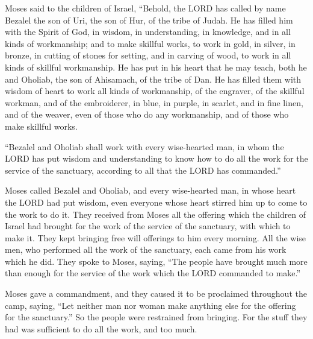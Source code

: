 \myverse{}Moses said to the children of Israel, “Behold, the LORD has
called by name Bezalel the son of Uri, the son of Hur, of the tribe of Judah.
\myverse{}He has filled him with the Spirit of God, in wisdom, in understanding, in
knowledge, and in all kinds of workmanship;
\myverse{}and to make skillful works, to work in gold, in silver, in bronze,
\myverse{}in cutting of stones for setting, and in carving of wood, to work in all
kinds of skillful workmanship.
\myverse{}He has put in his heart that he may teach, both he and Oholiab, the son of
Ahisamach, of the tribe of Dan.
\myverse{}He has filled them with wisdom of heart to work all kinds of workmanship,
of the engraver, of the skillful workman, and of the embroiderer, in blue, in purple, in scarlet, and
in fine linen, and of the weaver, even of those who do any workmanship, and of those who make skillful
works.


\mychapter{} \myverse*{}“Bezalel and Oholiab shall work with every wise-hearted man, in
whom the LORD has put wisdom and understanding to know how to do all the work for the service of the sanctuary,
according to all that the LORD has commanded.”


\myverse{}Moses called Bezalel and Oholiab, and every wise-hearted man,
in whose heart the LORD had put wisdom, even everyone whose heart stirred him up to come to the work to
do it.
\myverse{}They received from Moses all the offering which the children of Israel had
brought for the work of the service of the sanctuary, with which to make it. They kept bringing free will
offerings to him every morning.
\myverse{}All the wise men, who performed all the work of the sanctuary, each came from
his work which he did.
\myverse{}They spoke to Moses, saying, “The people have brought much more than enough
for the service of the work which the LORD commanded to make.”


\myverse{}Moses gave a commandment, and they caused it to be proclaimed
throughout the camp, saying, “Let neither man nor woman make anything else for the offering for the sanctuary.”
So the people were restrained from bringing.
\myverse{}For the stuff they had was sufficient to do all the work, and too much.



